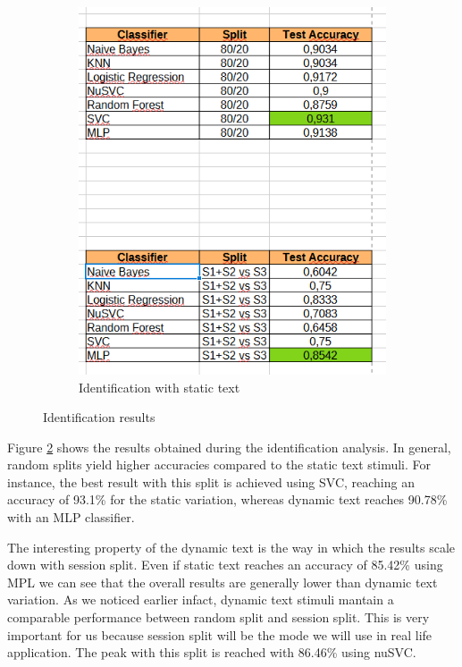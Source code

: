 \documentclass{article}
\begin{document}
\begin{figure}[htbp]
\begin{subfigure}[t]{0.49\textwidth}
        \includegraphics[width=\linewidth]{Images/Results/Static_Dynamic/id_stat.png}
        \caption{Identification with static text}
        \label{fig:stat_id}
    \end{subfigure}
    \caption{Identification results}
    \label{fig:id_stat_dyn}
\end{figure}

Figure \ref{fig:id_stat_dyn} shows the results obtained during the identification analysis. 
In general, random splits yield higher accuracies compared to the static text stimuli. 
For instance, the best result with this split is achieved using SVC, reaching an accuracy of 93.1\% for the static variation, whereas dynamic text reaches 90.78\% with an MLP classifier.

The interesting property of the dynamic text is the way in which the results scale down with session split. 
Even if static text reaches an accuracy of 85.42\% using MPL we can see that the overall results are generally lower than dynamic text variation. 
As we noticed earlier infact, dynamic text stimuli mantain a comparable performance between random split and session split. 
This is very important for us because session split will be the mode we will use in real life application. 
The peak with this split is reached with 86.46\% using nuSVC.
\end{document}
